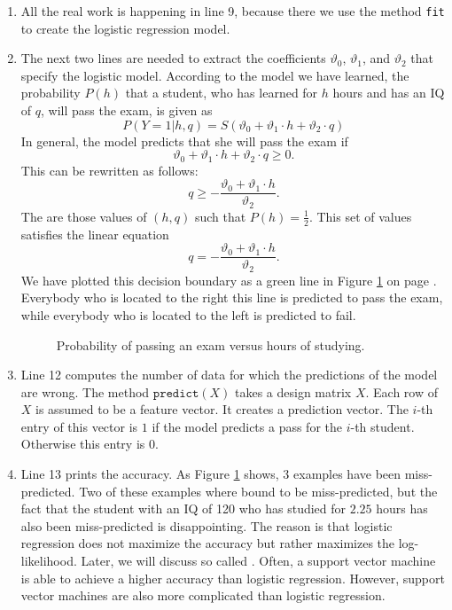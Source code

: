 \begin{enumerate}
\begin{enumerate}
      \end{enumerate}
\item All the real work is happening in line 9, because there we use the method \texttt{fit} to create the
      logistic regression model.
\item The next two lines are needed to extract the coefficients $\vartheta_0$, $\vartheta_1$, and $\vartheta_2$
      that specify the logistic model.      
      According to the model we have learned, the probability $P(h)$ that a student, who has learned for $h$
      hours and has an IQ of $q$, will pass the exam, is given as 
      $$ P(Y=1|h,q) = S(\vartheta_0 + \vartheta_1 \cdot h + \vartheta_2 \cdot q) $$
      In general, the model predicts that she will pass the exam if
      $$ \vartheta_0 + \vartheta_1 \cdot h + \vartheta_2 \cdot q \geq 0. $$
      This can be rewritten as follows:
      $$  q \geq -\frac{\vartheta_0 + \vartheta_1 \cdot h}{\vartheta_2}. $$
      The  are those values of $(h, q)$ such that $P(h) = \frac{1}{2}$.  This set of
      values satisfies the linear equation
      $$  q = -\frac{\vartheta_0 + \vartheta_1 \cdot h}{\vartheta_2}. $$
      We have plotted this decision boundary as a green line in Figure \ref{fig:exam-iq-boundary.pdf} on page
      \pageref{fig:exam-iq-boundary.pdf}.  Everybody who is located to the right  this line is predicted to pass the exam,
      while everybody who is located to the left is predicted to fail.


\begin{figure}[!th]
\caption{Probability of passing an exam versus hours of studying.}
\label{fig:exam-iq-boundary.pdf}
\end{figure}

\item Line 12 computes the number of data for which the predictions of the model are wrong.
      The method $\texttt{predict}(X)$ takes a design matrix $X$.  Each row of $X$ is assumed to be a feature
      vector. It creates a prediction vector.  The $i$-th entry of this vector is $1$ if the model predicts a
      pass for the $i$-th student.  Otherwise this entry is $0$.
\item Line 13 prints the accuracy.  As Figure \ref{fig:exam-iq-boundary.pdf} shows, 3 examples have been
      miss-predicted.  Two of these examples where bound to be miss-predicted, but the fact that the student
      with an IQ of 120 who has studied for $2.25$ hours has also been miss-predicted is disappointing.
      The reason is that logistic regression does not maximize the accuracy but rather
      maximizes the log-likelihood.  Later, we will discuss so called 
      .  Often, a support vector machine is able to achieve a higher accuracy
      than logistic regression.  However, support vector machines are also more complicated than logistic regression.
 \end{enumerate}
